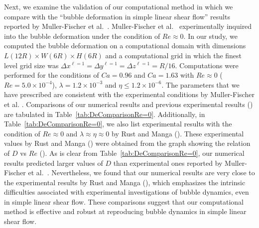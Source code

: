 \documentclass[review]{elsarticle}
\newcommand{\lwh}[3]{L(#1R)\times W(#2R) \times H(#3R)}
\begin{document}

Next, we examine the validation of our computational method in which we compare
with the ``bubble deformation in simple linear shear flow'' results reported by
Muller-Fischer et al.~\cite{MulTobDreFisWin08}.  Muller-Fischer et
al.~\cite{MulTobDreFisWin08} experimentally inquired into the bubble
deformation under the condition of $Re \approx 0$.  In our study, we computed
the bubble deformation on a computational domain with dimensions
$\lwh{12}{6}{6}$ and a computational grid in which the finest level grid size
was $\Delta x^{\ell=1} = \Delta y^{\ell=1} = \Delta z^{\ell=1} = R/16$.
Computations were performed for the conditions of $Ca = 0.96$ and $Ca = 1.63$
with $Re \approx 0$ ($Re = 5.0 \times 10^{-4}$),  $\lambda = 1.2 \times
10^{-3}$ and  $\eta \leq 1.2 \times 10^{-6}$.  The parameters that we have
prescribed are consistent with the experimental conditions by Muller-Fischer et
al.  \cite{MulTobDreFisWin08}.  Comparisons of our numerical results and
previous experimental results (\cite{MulTobDreFisWin08}) are tabulated in
Table~\ref{tab:DeComparisonRe=0}.  Additionally, in
Table~\ref{tab:DeComparisonRe=0}, we also list experimental results with the
condition of $Re \approx 0$ and $\lambda \approx \eta \approx 0$ by Rust and
Manga (\cite{RusMan02}). These experimental values by Rust and Manga
(\cite{RusMan02}) were obtained from the graph showing the relation of $D$ vs
$Re$ (\cite{RusMan02}).  As is clear from Table~\ref{tab:DeComparisonRe=0}, our
numerical results predicted larger values of $D$ than experimental ones
reported by Muller-Fischer et al.~\cite{MulTobDreFisWin08}. Nevertheless, we
found that our numerical results are very close to the experimental results by
Rust and Manga (\cite{RusMan02}), which emphasizes the intrinsic difficulties
associated with experimental investigations of bubble dynamics, even in simple
linear shear flow.  These comparisons suggest that our computational method is
effective and robust at reproducing bubble dynamics in simple linear shear
flow.
\end{document}

